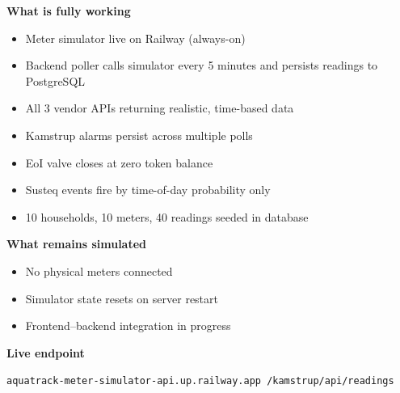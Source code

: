 
\begin{center}
  \hfill
  \hfill
\end{center}

\vspace{0.4em}

\begin{minipage}[t]{0.48\linewidth}
\textbf{What is fully working}
\begin{itemize}
  \item Meter simulator live on Railway (always-on)
  \item Backend poller calls simulator every 5 minutes and persists readings to PostgreSQL
  \item All 3 vendor APIs returning realistic, time-based data
  \item Kamstrup alarms persist across multiple polls
  \item EoI valve closes at zero token balance
  \item Susteq events fire by time-of-day probability only
  \item 10 households, 10 meters, 40 readings seeded in database
\end{itemize}
\end{minipage}
\hfill
\begin{minipage}[t]{0.48\linewidth}
\textbf{What remains simulated}
\begin{itemize}
  \item No physical meters connected
  \item Simulator state resets on server restart
  \item Frontend--backend integration in progress
\end{itemize}

\vspace{0.5em}
\textbf{Live endpoint}

\small\texttt{aquatrack-meter-simulator-api.up.railway.app /kamstrup/api/readings}

\vspace{0.5em}
\begin{center}
\end{center}
\end{minipage}
